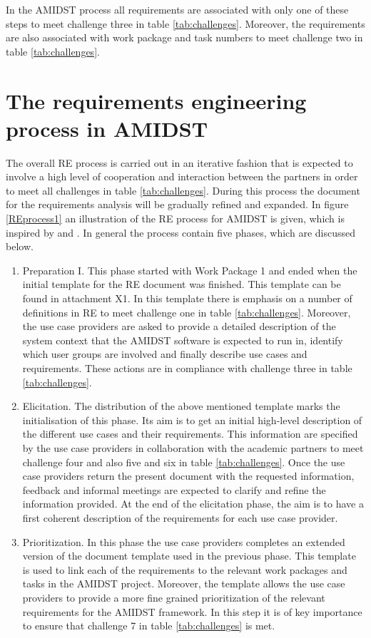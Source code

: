 \documentclass[11pt, oneside]{article}   	%
\begin{document}
In the AMIDST process all requirements are associated with only one of these steps to meet challenge three in table  \ref{tab:challenges}.  Moreover, the requirements are also associated with work package and task numbers to meet challenge two in table \ref{tab:challenges}.

\section{The requirements engineering process in AMIDST}
\label{sec:reprocess}

The overall RE process is carried out in an iterative fashion that is expected to involve a high level of cooperation and interaction between the partners in order to meet all challenges in table \ref{tab:challenges}. During this process the document for the requirements analysis will be gradually refined and expanded. In figure \ref{REprocess1}  an illustration of the RE process for AMIDST is given, which is inspired by and \cite{Ebe10}.  In general the process contain five phases, which are discussed below.\begin{enumerate}
 \item Preparation I.  This phase started with Work Package 1 and ended when the initial template for the RE document was finished.  This template can be found in attachment X1. In this template there is emphasis on a number of definitions in RE to meet challenge one in table \ref{tab:challenges}.  Moreover, the use case providers are asked to provide a detailed description of the system context that the AMIDST software is expected to run in, identify which user groups are involved and finally describe use cases and requirements.  These actions are in compliance with challenge three in table \ref{tab:challenges}.  
\item Elicitation. The distribution of the above mentioned template marks the initialisation of this phase.  Its aim is to get an initial high-level description of the different use cases and their requirements. This information are specified by the use case providers in collaboration with the academic partners to meet challenge four and also five and six in table \ref{tab:challenges}.  Once the use case providers return the present document with the requested information, feedback and informal meetings are expected to clarify and refine the information provided.  At the end of the elicitation phase, the aim is to have a first coherent description of the requirements for each use case provider.
 \item Prioritization. In this phase the use case providers completes an extended version of the document template used in the previous phase. This template is used to link each of the requirements to the relevant work packages and tasks in the AMIDST project. Moreover, the template allows the use case providers to provide a more fine grained prioritization of the relevant requirements for the AMIDST framework.  In this step it is of key importance to ensure that challenge 7 in table  \ref{tab:challenges} is met.

\end{enumerate}
\end{document}
